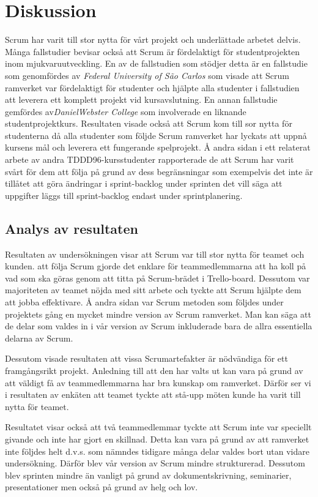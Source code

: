 
\section{Diskussion}
\label{sec:Lieth_Wahid-discussion}
Scrum har varit till stor nytta för vårt projekt och underlättade arbetet delvis. Många fallstudier bevisar också att Scrum är fördelaktigt för studentprojekten inom mjukvaruutveckling. En av de fallstudien som stödjer detta är
en fallstudie som genomfördes av \textit{Federal University of São Carlos} som visade att Scrum ramverket var fördelaktigt för studenter och hjälpte alla studenter i fallstudien att leverera ett komplett projekt vid kursavslutning. En annan fallstudie gemfördes av\textit{DanielWebster College} som involverade en liknande studentprojektkurs.\cite{GameDesign} Resultaten visade också att Scrum kom till sor nytta för studenterna då alla studenter som följde Scrum ramverket har lyckats att uppnå kursens mål och leverera ett fungerande spelprojekt. Å andra sidan i ett relaterat arbete av andra TDDD96-kursstudenter rapporterade de att Scrum har varit svårt för dem att följa på grund av dess begränsningar som exempelvis det inte är tillåtet att göra ändringar i sprint-backlog under sprinten det vill säga att uppgifter läggs till sprint-backlog endast under sprintplanering.\cite{overvakn73:online}


\subsection{Analys av resultaten}
Resultaten av undersökningen visar att Scrum var till stor nytta för teamet och kunden. att följa Scrum gjorde det enklare för teammedlemmarna att ha koll på vad som ska göras genom att titta på Scrum-brädet i Trello-board. Dessutom var majoriteten av teamet nöjda med sitt arbete och tyckte att Scrum hjälpte dem att jobba effektivare. Å andra sidan var Scrum metoden som följdes under projektets gång en mycket mindre version av Scrum ramverket. Man kan säga att de delar som valdes in i vår version av Scrum inkluderade bara de allra essentiella delarna av Scrum.

Dessutom visade resultaten att vissa Scrumartefakter är nödvändiga för ett framgångsrikt projekt. Anledning till att den har valts ut kan vara på grund av att väldigt få av teammedlemmarna har bra kunskap om ramverket. Därför ser vi i resultaten av enkäten att teamet tyckte att stå-upp möten kunde ha varit till nytta för teamet. 

Resultatet visar också  att två teammedlemmar tyckte att Scrum inte var speciellt givande och inte har gjort en skillnad. Detta kan vara på grund av att ramverket inte följdes helt d.v.s. som nämndes tidigare många delar valdes bort utan vidare undersökning. Därför blev vår version av Scrum mindre strukturerad. Dessutom blev sprinten mindre än vanligt på grund av dokumentskrivning, seminarier, presentationer men också på grund av helg och lov.
